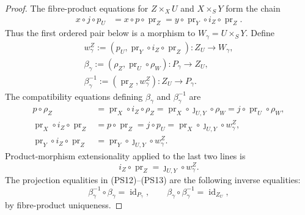\begin{proof}
  The fibre-product equations for $Z\times_XU$ and $X\times_SY$ form the
  chain
  \[
  \begin{aligned}
    x\circ j\circ p_U
      &=x\circ p\circ\operatorname{pr}_Z
       =y\circ\operatorname{pr}_Y\circ i_Z\circ\operatorname{pr}_Z.
  \end{aligned}                                                  \tag{PS12a}
  \]
  Thus the first ordered pair below is a morphism to
  $W_\gamma=U\times_SY$.  Define
  \[
  \begin{gathered}
    w_\gamma^Z:=
      (p_U,\operatorname{pr}_Y\circ i_Z\circ\operatorname{pr}_Z)
      \colon Z_U\to W_\gamma,\\
    \beta_\gamma:=(\rho_Z,\operatorname{pr}_U\circ\rho_W)
      \colon P_\gamma\to Z_U,\\
    \beta_\gamma^{-1}:=(\operatorname{pr}_Z,w_\gamma^Z)
      \colon Z_U\to P_\gamma.                                  
  \end{gathered} \tag{PS12}
  \]
  The compatibility equations defining $\beta_\gamma$ and
  $\beta_\gamma^{-1}$ are
  \[
  \begin{aligned}
    p\circ\rho_Z
      &=\operatorname{pr}_X\circ i_Z\circ\rho_Z
       =\operatorname{pr}_X\circ\jmath_{U,Y}\circ\rho_W
       =j\circ\operatorname{pr}_U\circ\rho_W,\\
    \operatorname{pr}_X\circ i_Z\circ\operatorname{pr}_Z
      &=p\circ\operatorname{pr}_Z
       =j\circ p_U
       =\operatorname{pr}_X\circ\jmath_{U,Y}\circ w_\gamma^Z,\\
    \operatorname{pr}_Y\circ i_Z\circ\operatorname{pr}_Z
      &=\operatorname{pr}_Y\circ\jmath_{U,Y}\circ w_\gamma^Z.
  \end{aligned}                                                   \tag{PS13}
  \]
  Product-morphism extensionality applied to the last two lines is
  \[
    i_Z\circ\operatorname{pr}_Z
      =\jmath_{U,Y}\circ w_\gamma^Z.
  \]
  The projection equalities in (PS12)--(PS13) are the following inverse
  equalities:
  \[
    \beta_\gamma^{-1}\circ\beta_\gamma
      =\operatorname{id}_{P_\gamma},\qquad
    \beta_\gamma\circ\beta_\gamma^{-1}
      =\operatorname{id}_{Z_U},                                  \tag{PS14}
  \]
  by fibre-product uniqueness.


\end{proof}
